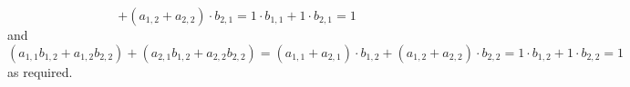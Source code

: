 \begin{exercises}
\begin{answer}
\begin{exparts}
\begin{equation*}
                +(a_{1,2}+a_{2,2})\cdot b_{2,1}
              =1\cdot b_{1,1}+1\cdot b_{2,1}
              =1
            \end{equation*}
            and
            \begin{equation*}
              (a_{1,1}b_{1,2}+a_{1,2}b_{2,2})
              +(a_{2,1}b_{1,2}+a_{2,2}b_{2,2})
              =(a_{1,1}+a_{2,1})\cdot b_{1,2}
                +(a_{1,2}+a_{2,2})\cdot b_{2,2}
              =1\cdot b_{1,2}+1\cdot b_{2,2}
              =1
            \end{equation*}
            as required.
      \end{exparts}
    \end{answer}
\end{exercises}


